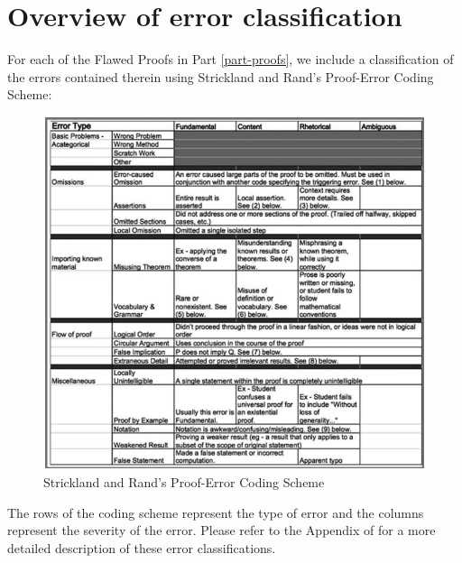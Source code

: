 \section{Overview of error classification}\label{sec-error}
For each of the Flawed Proofs in Part \ref{part-proofs}, we include a classification of the errors contained therein using Strickland and Rand's Proof-Error Coding Scheme:


\begin{figure}[h] %
\caption{Strickland and Rand's Proof-Error Coding Scheme \cite[Figure 1]{Strickland_2016}}\label{fig-sr-err}
\includegraphics[width=\linewidth]{Error/Strickland&Rand_CodingSchemeMatrix(Fig1_PRIMUS_26_10_905-921)}
\end{figure}

The rows of the coding scheme represent the type of error and the columns represent the severity of the error. Please refer to the Appendix of \cite[Figure 1]{Strickland_2016} for a more detailed description of these error classifications.

